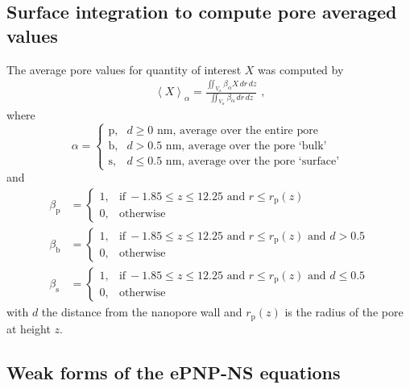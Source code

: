 \documentclass[journal=ancac3, manuscript=suppinfo, etalmode=truncate,maxauthors=0]{achemso}
\begin{document}
\newpage
\subsection{Surface integration to compute pore averaged values}
The average pore values for quantity of interest $X$ was computed by
\begin{align}
  \left< X \right>_{\alpha} =
    \displaystyle\frac{\displaystyle\iint_{V_{\alpha}} \beta_{\alpha} X \,dr\,dz}
                      {\displaystyle\iint_{V_{\alpha}} \beta_{\alpha} \,dr\,dz}
  \text{ ,}
\end{align}
where
\begin{equation}
  \alpha=
  \begin{cases}
    \text{p}, & d \ge 0  \text{~nm} \text{, average over the entire pore} \\
    \text{b}, & d > 0.5  \text{~nm} \text{, average over the pore `bulk' }  \\
    \text{s}, & d \le 0.5\text{~nm} \text{, average over the pore `surface' } 
  \end{cases}
\end{equation}
and
\begin{align}
  \beta_{\text{p}} &=
  \begin{cases}
    1, & \text{if}\ -1.85\le z \le 12.25  \text{ and } r \le r_\text{p}(z) \\
    0, & \text{otherwise}
  \end{cases} \\
  \beta_{\text{b}} &=
  \begin{cases}
  1, & \text{if}\ -1.85\le z \le 12.25  \text{ and } r \le r_\text{p}(z) \text{ and } d > 0.5 \\
  0, & \text{otherwise}
  \end{cases} \\
  \beta_{\text{s}} &=
  \begin{cases}
  1, & \text{if}\ -1.85\le z \le 12.25  \text{ and } r \le r_\text{p}(z) \text{ and } d \le 0.5 \\
  0, & \text{otherwise}
  \end{cases}
\end{align}
with $d$ the distance from the nanopore wall and $r_\text{p}(z)$ is the radius of the pore at height $z$.

\newpage
\subsection{Weak forms of the ePNP-NS equations}
\end{document}
